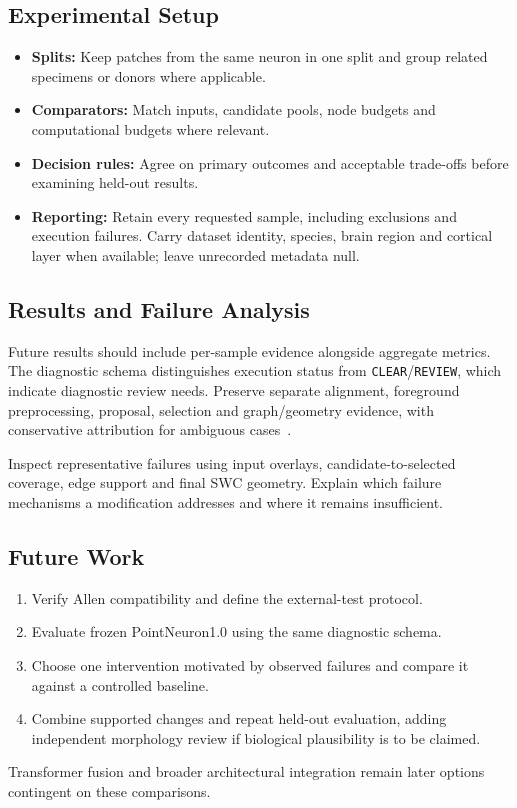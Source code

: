 \documentclass[11pt,a4paper]{article}
\begin{document}
\subsection{Experimental Setup}
\begin{itemize}
    \item \textbf{Splits:} Keep patches from the same neuron in one split and group related specimens or donors where applicable.
    \item \textbf{Comparators:} Match inputs, candidate pools, node budgets and computational budgets where relevant.
    \item \textbf{Decision rules:} Agree on primary outcomes and acceptable trade-offs before examining held-out results.
    \item \textbf{Reporting:} Retain every requested sample, including exclusions and execution failures. Carry dataset identity, species, brain region and cortical layer when available; leave unrecorded metadata null.
\end{itemize}

\subsection{Results and Failure Analysis}
Future results should include per-sample evidence alongside aggregate metrics. The diagnostic schema distinguishes execution status from \texttt{CLEAR}/\texttt{REVIEW}, which indicate diagnostic review needs. Preserve separate alignment, foreground preprocessing, proposal, selection and graph/geometry evidence, with conservative attribution for ambiguous cases~\cite{diagnostics}.

Inspect representative failures using input overlays, candidate-to-selected coverage, edge support and final SWC geometry. Explain which failure mechanisms a modification addresses and where it remains insufficient.

\subsection{Future Work}
\begin{enumerate}
    \item Verify Allen compatibility and define the external-test protocol.
    \item Evaluate frozen PointNeuron1.0 using the same diagnostic schema.
    \item Choose one intervention motivated by observed failures and compare it against a controlled baseline.
    \item Combine supported changes and repeat held-out evaluation, adding independent morphology review if biological plausibility is to be claimed.
\end{enumerate}
Transformer fusion and broader architectural integration remain later options contingent on these comparisons.
\end{document}
